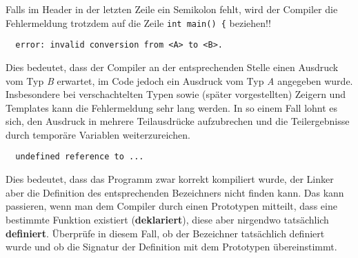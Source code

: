 

Falls im Header  in der letzten Zeile ein Semikolon fehlt, wird der Compiler die Fehlermeldung trotzdem auf die Zeile \glqq{}\lstinline{int main() {}\grqq{} beziehen!!

\begin{verbatim}
  error: invalid conversion from <A> to <B>.
\end{verbatim}

Dies bedeutet, dass der Compiler an der entsprechenden Stelle einen Ausdruck vom Typ \emph{B} erwartet, im Code jedoch ein Ausdruck vom Typ \emph{A} angegeben wurde. Insbesondere bei verschachtelten Typen sowie (später vorgestellten) Zeigern und Templates kann die Fehlermeldung sehr lang werden. In so einem Fall lohnt es sich, den Ausdruck in mehrere Teilausdrücke aufzubrechen und die Teilergebnisse durch temporäre Variablen weiterzureichen.

\begin{verbatim}
  undefined reference to ...
\end{verbatim}

Dies bedeutet, dass das Programm zwar korrekt kompiliert wurde, der Linker aber die Definition des entsprechenden Bezeichners nicht finden kann.
Das kann passieren, wenn man dem Compiler durch einen Prototypen mitteilt, dass eine bestimmte Funktion existiert (\textbf{deklariert}), diese aber nirgendwo tatsächlich \textbf{definiert}.
Überprüfe in diesem Fall, ob der Bezeichner tatsächlich definiert wurde und ob die Signatur der Definition mit dem Prototypen übereinstimmt.
